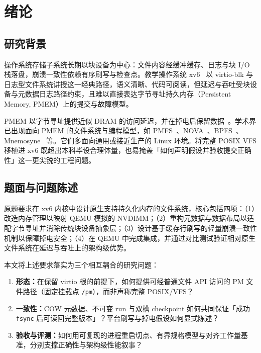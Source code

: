 \chapter{绪论}
\label{chap:intro}

\section{研究背景}

操作系统存储子系统长期以块设备为中心：文件内容经缓冲缓存、日志与块 I/O 栈落盘，崩溃一致性依赖有序刷写与检查点。教学操作系统 xv6~\cite{xv6book} 以 virtio-blk 与日志型文件系统讲授这一经典路径，语义清晰、代码可阅读，但延迟与吞吐受块设备与元数据日志路径约束，且难以直接表达字节寻址持久内存（Persistent Memory, PMEM）上的提交与故障模型。

PMEM 以字节寻址提供近似 DRAM 的访问延迟，并在掉电后保留数据~\cite{nvmm2021}。学术界已出现面向 PMEM 的文件系统与编程模型，如 PMFS~\cite{pmfs2014}、NOVA~\cite{nova2016}、BPFS~\cite{bpfs2009}、Mnemosyne~\cite{mnemosyne2011} 等。它们多面向通用或接近生产的 Linux 环境。将完整 POSIX VFS 移植进 xv6 既超出本科毕设合理体量，也易掩盖「如何声明假设并验收提交正确性」这一更尖锐的工程问题。

\section{题面与问题陈述}

原题要求在 xv6 内核中设计原生支持持久化内存的文件系统，核心包括四项：（1）改造内存管理以映射 QEMU 模拟的 NVDIMM；（2）重构元数据与数据布局以适配字节寻址并消除传统块设备抽象层；（3）设计基于缓存行刷写的轻量崩溃一致性机制以保障掉电安全；（4）在 QEMU 中完成集成，并通过对比测试验证相对原生文件系统在延迟与吞吐上的架构级优势。

本文将上述要求落实为三个相互耦合的研究问题：

\begin{enumerate}[leftmargin=2em]
  \item \textbf{形态：}在保留 virtio 根的前提下，如何提供可经普通文件 API 访问的 PM 文件路径（固定挂载点 \texttt{/pm}），而非声称完整 POSIX/VFS？
  \item \textbf{一致性：}COW 元数据、不可变 run 与双槽 checkpoint 如何共同保证「成功 \texttt{fsync} 后可读回完整版本」？平台刷写与掉电假设如何显式陈述？
  \item \textbf{验收与评测：}如何用可复现的进程重启切点、有界规格模型与对齐工作量基准，分别支撑正确性与架构级性能叙事？
\end{enumerate}


